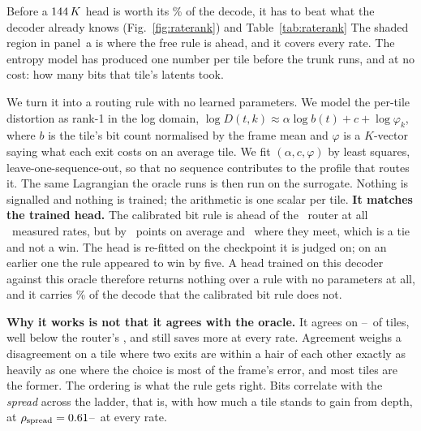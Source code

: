 \documentclass[10pt,twocolumn,letterpaper]{article}
\begin{document}
Before a $144\,K$ head is worth its \RouterCostPct\% of the decode, it has
to beat what the decoder already knows (Fig.~\ref{fig:raterank}) and Table~\ref{tab:raterank} The shaded region in panel~a is where the free rule is ahead, and it covers
every rate. The entropy model has produced one
number per tile before the trunk runs, and at no cost: how many bits that tile's
latents took.

We turn it into a routing rule with no learned parameters. We model the
per-tile distortion as rank-1 in the log domain,
$\log D(t,k)\approx\alpha\log b(t)+c+\log\varphi_k$, where $b$ is the tile's bit
count normalised by the frame mean and $\varphi$ is a $K$-vector saying what each
exit costs on an average tile. We fit $(\alpha,c,\varphi)$ by least squares,
leave-one-sequence-out, so that no sequence contributes to the profile that
routes it. The same Lagrangian the oracle runs is then run on the surrogate.
Nothing is signalled and nothing is trained; the arithmetic is one scalar per
tile. \textbf{It matches the trained head.} The calibrated bit rule is ahead of
the \RouterParams\ router at all \RateRankNWins\ measured rates, but by
\RateRankBeatsMean\ points on average and \RateRankBeatsMin\ where they meet,
which is a tie and not a win. The head is re-fitted on the checkpoint it is
judged on; on an earlier one the rule appeared to win by five. A head trained
on this decoder against this oracle
therefore returns nothing over a rule with no parameters at all, and it carries
\RouterCostPct\% of the decode that the calibrated bit rule does not.

\textbf{Why it works is not that it agrees with the oracle.} It agrees on
\RateRankAgreeLo--\RateRankAgreeHi\ of tiles, well below the
router's \RouterHeldAgree,
and still saves more at every rate. Agreement weighs a disagreement on
a tile where two exits are within a hair of each other exactly as heavily as one
where the choice is most of the frame's error, and most tiles are the former.
The ordering is what the rule gets right. Bits correlate with the \emph{spread}
across the ladder, that is, with how much a tile stands to gain from depth, at
$\rho_{\mathrm{spread}}=0.61$--\RateRankSpreadHi\ at every rate.
\end{document}
